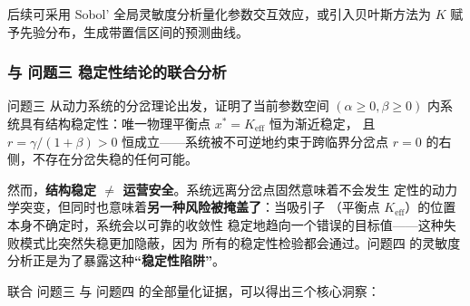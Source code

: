 \documentclass[12pt,a4paper]{ctexart}
\begin{document}
后续可采用 Sobol' 全局灵敏度分析\cite{saltelli}量化参数交互效应，或引入贝叶斯方法为 $K$ 赋予先验分布，生成带置信区间的预测曲线。

\subsubsection{与 问题三 稳定性结论的联合分析}

问题三 从动力系统的分岔理论出发，证明了当前参数空间 $(\alpha \geq 0, \beta \geq 0)$
内系统具有结构稳定性：唯一物理平衡点 $x^* = K_{\text{eff}}$ 恒为渐近稳定，
且 $r = \gamma/(1+\beta) > 0$ 恒成立——系统被不可逆地约束于跨临界分岔点
$r = 0$ 的右侧，不存在分岔失稳的任何可能。

然而，\textbf{结构稳定 $\neq$ 运营安全}。系统远离分岔点固然意味着不会发生
定性的动力学突变，但同时也意味着\textbf{另一种风险被掩盖了}：当吸引子
（平衡点 $K_{\text{eff}}$）的位置本身不确定时，系统会以可靠的收敛性
稳定地趋向一个错误的目标值——这种失败模式比突然失稳更加隐蔽，因为
所有的稳定性检验都会通过。问题四 的灵敏度分析正是为了暴露这种\textbf{``稳定性陷阱''}。

联合 问题三 与 问题四 的全部量化证据，可以得出三个核心洞察：
\end{document}

